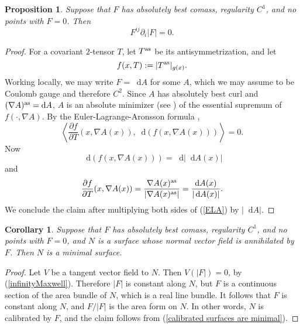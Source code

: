 \documentclass[reqno,11pt]{amsart}
\newcommand*\dif{\mathop{}\!\mathrm{d}}
\newtheorem{proposition}[theorem]{Proposition}
\newtheorem{corollary}[theorem]{Corollary}
\theoremstyle{definition}
\numberwithin{equation}{section}
\begin{document}
\begin{proposition}
Suppose that $F$ has absolutely best comass, regularity $C^1$, and no points with $F = 0$. Then
\begin{equation}\label{infinityMaxwell}
	F^{ij} \partial_i |F| = 0.
\end{equation}
\end{proposition}
\begin{proof}
For a covariant $2$-tensor $T$, let $T^{\rm as}$ be its antisymmetrization, and let
$$f(x, T) := |T^{\rm as}|_{g(x)}.$$
Working locally, we may write $F = \dif A$ for some $A$, which we may assume to be Coulomb gauge and therefore $C^2$.
Since $A$ has absolutely best curl and $(\nabla A)^{\rm as} = \dif A$, $A$ is an absolute minimizer (see \cite[Definition 5.1]{Barron2001}) of the essential supremum of $f(\cdot, \nabla A)$.
By the Euler-Lagrange-Aronsson formula \cite[Theorem 5.2]{Barron2001},
\begin{equation}\label{ELA}
	\left\langle \frac{\partial f}{\partial T}(x, \nabla A(x)), \dif (f(x, \nabla A(x))) \right\rangle = 0.
\end{equation}
Now
$$\dif(f(x, \nabla A(x))) = \dif |\dif A(x)|$$
and 
$$\frac{\partial f}{\partial T}(x, \nabla A(x)) = \frac{\nabla A(x)^{\rm as}}{|\nabla A(x)^{\rm as}|} = \frac{\dif A(x)}{|\dif A(x)|}.$$
We conclude the claim after multiplying both sides of (\ref{ELA}) by $|\dif A|$.
\end{proof}

\begin{corollary}
Suppose that $F$ has absolutely best comass, regularity $C^1$, and no points with $F = 0$, and $N$ is a surface whose normal vector field is annihilated by $F$.
Then $N$ is a minimal surface.
\end{corollary}
\begin{proof}
Let $V$ be a tangent vector field to $N$. Then $V(|F|) = 0$, by (\ref{infinityMaxwell}).
Therefore $|F|$ is constant along $N$, but $F$ is a continuous section of the area bundle of $N$, which is a real line bundle.
It follows that $F$ is constant along $N$, and $F/|F|$ is the area form on $N$.
In other words, $N$ is calibrated by $F$, and the claim follows from (\ref{calibrated surfaces are minimal}).
\end{proof}

\printbibliography
\end{document}
